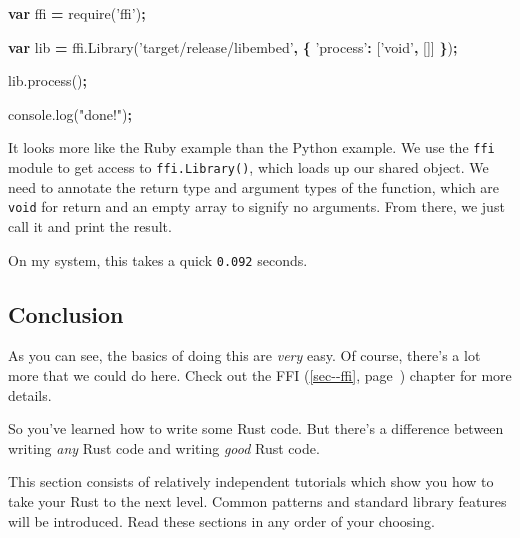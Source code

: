 \documentclass[a4paper,]{book}
\renewcommand*{\hyperref}[2][\ar]{%
  \def\ar{#2}%
  #2 (\autoref{#1}, page~\pageref{#1})}
\newenvironment{Shaded}{\begin{snugshade}}{\end{snugshade}}
\newcommand{\KeywordTok}[1]{\textcolor[rgb]{0.13,0.29,0.53}{\textbf{{#1}}}}
\newcommand{\StringTok}[1]{\textcolor[rgb]{0.31,0.60,0.02}{{#1}}}
\newcommand{\VariableTok}[1]{\textcolor[rgb]{0.00,0.00,0.00}{{#1}}}
\newcommand{\OperatorTok}[1]{\textcolor[rgb]{0.81,0.36,0.00}{\textbf{{#1}}}}
\newcommand{\AttributeTok}[1]{\textcolor[rgb]{0.77,0.63,0.00}{{#1}}}
\newcommand{\NormalTok}[1]{{#1}}
\begin{document}
\begin{Shaded}
\begin{Highlighting}[]
\KeywordTok{var} \NormalTok{ffi }\OperatorTok{=} \AttributeTok{require}\NormalTok{(}\StringTok{'ffi'}\NormalTok{)}\OperatorTok{;}

\KeywordTok{var} \NormalTok{lib }\OperatorTok{=} \VariableTok{ffi}\NormalTok{.}\AttributeTok{Library}\NormalTok{(}\StringTok{'target/release/libembed'}\OperatorTok{,} \OperatorTok{\{}
  \StringTok{'process'}\OperatorTok{:} \NormalTok{[}\StringTok{'void'}\OperatorTok{,} \NormalTok{[]]}
\OperatorTok{\}}\NormalTok{)}\OperatorTok{;}

\VariableTok{lib}\NormalTok{.}\AttributeTok{process}\NormalTok{()}\OperatorTok{;}

\VariableTok{console}\NormalTok{.}\AttributeTok{log}\NormalTok{(}\StringTok{"done!"}\NormalTok{)}\OperatorTok{;}
\end{Highlighting}
\end{Shaded}

It looks more like the Ruby example than the Python example. We use the
\texttt{ffi} module to get access to \texttt{ffi.Library()}, which loads
up our shared object. We need to annotate the return type and argument
types of the function, which are \texttt{void} for return and an empty
array to signify no arguments. From there, we just call it and print the
result.

On my system, this takes a quick \texttt{0.092} seconds.

\subsection{Conclusion}\label{conclusion}

As you can see, the basics of doing this are \emph{very} easy. Of
course, there's a lot more that we could do here. Check out the
\hyperref[sec--ffi]{FFI} chapter for more details.


So you've learned how to write some Rust code. But there's a difference
between writing \emph{any} Rust code and writing \emph{good} Rust code.

This section consists of relatively independent tutorials which show you
how to take your Rust to the next level. Common patterns and standard
library features will be introduced. Read these sections in any order of
your choosing.
\end{document}
